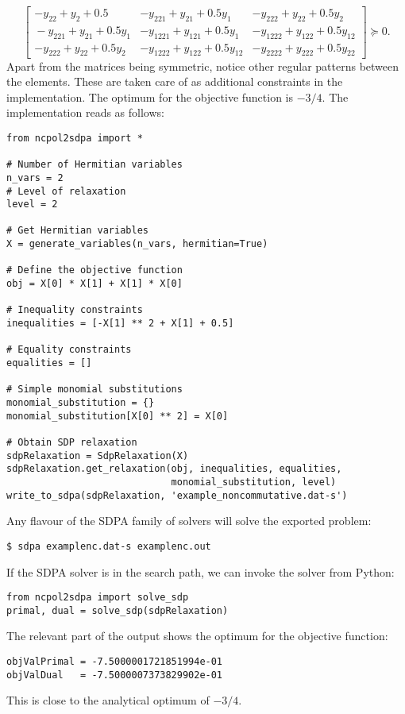 \documentclass{article}
\begin{document}
\[
\left[ \begin{array}{c|cc}
-y_{22}+y_{2}+0.5 & -y_{221}+y_{21}+0.5y_{1} & -y_{222}+y_{22}+0.5y_{2}\\
\hline{}
-y_{221}+y_{21}+0.5y_{1} & -y_{1221}+y_{121}+0.5y_{1} & -y_{1222}+y_{122}+0.5y_{12}\\
-y_{222}+y_{22}+0.5y_{2} & -y_{1222}+y_{122}+0.5y_{12} & -y_{2222}+y_{222}+0.5y_{22}
\end{array}\right]\succeq{}0.
\]
Apart from the matrices being symmetric, notice other regular patterns between the elements. These are taken care of as additional constraints in the implementation. The optimum for the objective function is $-3/4$. The implementation reads as follows:
\begin{verbatim}
from ncpol2sdpa import *

# Number of Hermitian variables
n_vars = 2
# Level of relaxation
level = 2

# Get Hermitian variables
X = generate_variables(n_vars, hermitian=True)

# Define the objective function
obj = X[0] * X[1] + X[1] * X[0]

# Inequality constraints
inequalities = [-X[1] ** 2 + X[1] + 0.5]

# Equality constraints
equalities = []

# Simple monomial substitutions
monomial_substitution = {}
monomial_substitution[X[0] ** 2] = X[0]

# Obtain SDP relaxation
sdpRelaxation = SdpRelaxation(X)
sdpRelaxation.get_relaxation(obj, inequalities, equalities,
                             monomial_substitution, level)
write_to_sdpa(sdpRelaxation, 'example_noncommutative.dat-s')
\end{verbatim}

Any flavour of the SDPA family of solvers will solve the exported problem:
\begin{verbatim}
$ sdpa examplenc.dat-s examplenc.out
\end{verbatim}

If the SDPA solver is in the search path, we can invoke the solver from Python:
\begin{verbatim}
from ncpol2sdpa import solve_sdp
primal, dual = solve_sdp(sdpRelaxation)
\end{verbatim}

The relevant part of the output shows the optimum for the objective function:
\begin{verbatim}
objValPrimal = -7.5000001721851994e-01
objValDual   = -7.5000007373829902e-01
\end{verbatim}
This is close to the analytical optimum of $-3/4$.
\end{document}
